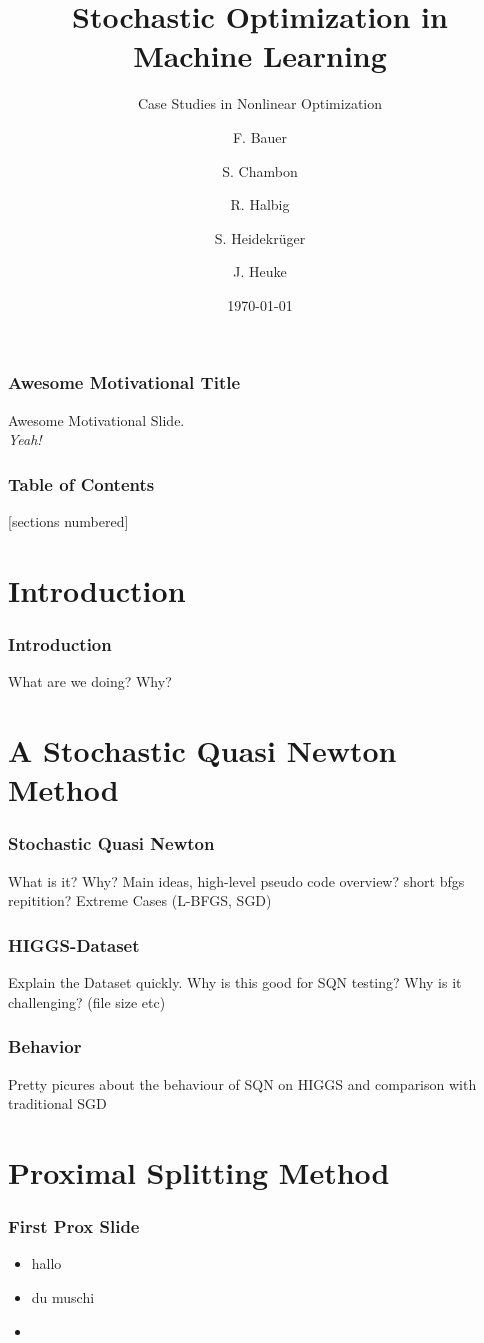 \documentclass[10pt]{beamer}
\title{Stochastic Optimization in Machine Learning}
\subtitle{Case Studies in Nonlinear Optimization}
\date{\today}
\author{F. Bauer \and S. Chambon \and R. Halbig \and S. Heidekrüger \and J. Heuke}
\institute{Technische Universität München}
\begin{document}
\maketitle

\begin{frame}
  \frametitle{Awesome Motivational Title}
  Awesome Motivational Slide.\\
  \emph{Yeah!}
\end{frame}

\begin{frame}
  \frametitle{Table of Contents}
  [sections numbered]
  \tableofcontents[hideallsubsections]
\end{frame}

\section{Introduction}

  \begin{frame}
    \frametitle{Introduction}
    What are we doing?
    Why?
  \end{frame}

\section{A Stochastic Quasi Newton Method}

  \begin{frame}
    \frametitle{Stochastic Quasi Newton}
      What is it?
      Why?
      Main ideas, high-level pseudo code overview?
      short bfgs repitition?
      Extreme Cases (L-BFGS, SGD)
  \end{frame}

  \begin{frame}
    \frametitle{HIGGS-Dataset}
    Explain the Dataset quickly.
    Why is this good for SQN testing?
    Why is it challenging? (file size etc)
  \end{frame}

  \begin{frame}
    \frametitle{Behavior}
      Pretty picures about the behaviour of SQN on HIGGS
      and comparison with traditional SGD
  \end{frame}

 \section{Proximal Splitting Method}

   \begin{frame}\frametitle{First Prox Slide}
       \begin{itemize}
            \item hallo
            \item \alert{du muschi}
            \item \cite{becker2012quasi}
          \end{itemize}   
   
   \end{frame}
\end{document}
